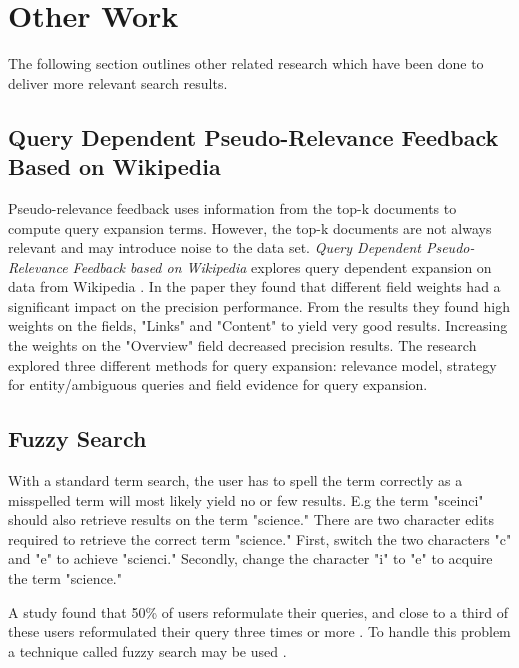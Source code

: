
\section{Other Work}
The following section outlines other related research which have been done to deliver more relevant search results.

\subsection{Query Dependent Pseudo-Relevance Feedback Based on Wikipedia}
Pseudo-relevance feedback uses information from the top-k documents to compute query expansion terms.
However, the top-k documents are not always relevant and may introduce noise to the data set.
\textit{Query Dependent Pseudo-Relevance Feedback based on Wikipedia} explores query dependent expansion on data from Wikipedia \cite{pseudo-relevance-wikipedia}.
In the paper they found that different field weights had a significant impact on the precision performance.
From the results they found high weights on the fields, "Links" and "Content" to yield very good results.
Increasing the weights on the "Overview" field decreased precision results.
The research explored three different methods for query expansion:
relevance model, strategy for entity/ambiguous queries and field evidence for query expansion.

\subsection{Fuzzy Search}
With a standard term search, the user has to spell the term correctly as a misspelled term will most likely yield no or few results.
E.g the term "sceinci" should also retrieve results on the term "science."
There are two character edits required to retrieve the correct term "science."
First, switch the two characters "c" and "e" to achieve "scienci."
Secondly, change the character "i" to "e" to acquire the term "science."

A study found that 50\% of users reformulate their queries, and close to a third of these users reformulated their query three times or more \cite{query-reformulate}.
To handle this problem a technique called fuzzy search may be used \cite{fuzzy-search}.

